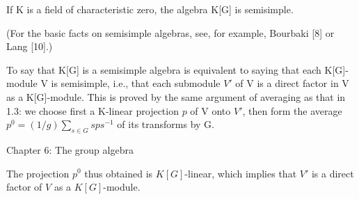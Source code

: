 If K is a field of characteristic zero, the algebra K[G] is semisimple.

(For the basic facts on semisimple algebras, see, for example, Bourbaki [8] or Lang [10].)

To say that K[G] is a semisimple algebra is equivalent to saying that each K[G]-module V is semisimple, i.e., that each submodule $V'$ of V is a direct factor in V as a K[G]-module. This is proved by the same argument of averaging as that in 1.3: we choose first a K-linear projection $p$ of V onto $V'$, then form the average $p^0 = (1/g) \sum_{s \in G} sps^{-1}$ of its transforms by G.

Chapter 6: The group algebra

The projection $p^0$ thus obtained is $K[G]$-linear, which implies that $V'$ is a direct factor of $V$ as a $K[G]$-module.
